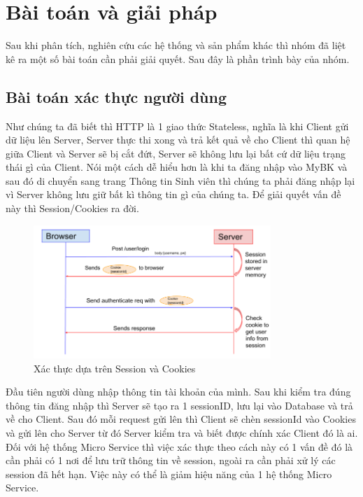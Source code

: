 \chapter{Bài toán và giải pháp}\label{chap:ProblemAndSolve}
		Sau khi phân tích, nghiên cứu các hệ thống và sản phẩm khác thì nhóm đã liệt kê ra một số bài toán cần phải giải quyết. Sau đây là phần trình bày của nhóm.
		
		\section{Bài toán xác thực người dùng}
		Như chúng ta đã biết thì HTTP là 1 giao thức Stateless, nghĩa là khi Client gửi dữ liệu lên Server, Server thực thi xong và trả kết quả về cho Client thì quan hệ giữa Client và Server sẽ bị cắt đứt, Server sẽ không lưu lại bất cứ dữ liệu trạng thái gì của Client. Nói một cách dễ hiểu hơn là khi ta đăng nhập vào MyBK và sau đó di chuyển sang trang Thông tin Sinh viên thì chúng ta phải đăng nhập lại vì Server không lưu giữ bất kì thông tin gì của chúng ta. Để giải quyết vấn đề này thì Session/Cookies ra đời.
	
		\begin{figure}[H]
			\includegraphics[width=0.8\textwidth]{Images/session-cookies.png}
			\centering
			\linebreak
			\caption{Xác thực dựa trên Session và Cookies \cite{sessioncookies}}
		\end{figure}
		
		Đầu tiên người dùng nhập thông tin tài khoản của mình. Sau khi kiểm tra đúng thông tin đăng nhập thì Server sẽ tạo ra 1 sessionID, lưu lại vào Database và trả về cho Client. Sau đó mỗi request gửi lên thì Client sẽ chèn sessionId vào Cookies và gửi lên cho Server từ đó Server kiểm tra và biết được chính xác Client đó là ai.\\
		
		Đối với hệ thống Micro Service thì việc xác thực theo cách này có 1 vấn đề đó là cần phải có 1 nơi để lưu trữ thông tin về session, ngoài ra cần phải xử lý các session đã hết hạn. Việc này có thể là giảm hiệu năng của 1 hệ thống Micro Service.\\
		

